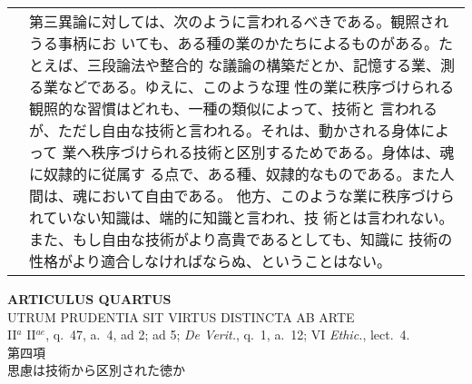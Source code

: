 \documentclass[10pt]{jsarticle}
\begin{document}
\begin{longtable}{p{21em}p{21em}}
&

第三異論に対しては、次のように言われるべきである。観照されうる事柄にお
いても、ある種の業のかたちによるものがある。たとえば、三段論法や整合的
な議論の構築だとか、記憶する業、測る業などである。ゆえに、このような理
性の業に秩序づけられる観照的な習慣はどれも、一種の類似によって、技術と
言われるが、ただし自由な技術と言われる。それは、動かされる身体によって
業へ秩序づけられる技術と区別するためである。身体は、魂に奴隷的に従属す
る点で、ある種、奴隷的なものである。また人間は、魂において自由である。
他方、このような業に秩序づけられていない知識は、端的に知識と言われ、技
術とは言われない。また、もし自由な技術がより高貴であるとしても、知識に
技術の性格がより適合しなければならぬ、ということはない。

\end{longtable}
\newpage

\begin{center}
 {\Large {\bf ARTICULUS QUARTUS}}\\ {\large UTRUM PRUDENTIA SIT VIRTUS
 DISTINCTA AB ARTE}\\ {\footnotesize II$^a$ II$^{ae}$, q.~47, a.~4, ad
 2; ad 5; {\itshape De Verit.}, q.~1, a.~12; VI {\itshape Ethic.},
 lect.~4.}\\ {\Large 第四項\\思慮は技術から区別された徳か}
\end{center}
\end{document}
